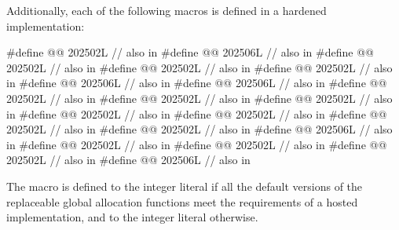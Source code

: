 \pnum
Additionally, each of the following macros is defined in a hardened implementation:
\begin{codeblock}
#define @@                    202502L // also in 
#define @@         202506L // also in 
#define @@             202502L // also in 
#define @@        202502L // also in 
#define @@                   202502L // also in 
#define @@          202506L // also in 
#define @@         202506L // also in 
#define @@                    202502L // also in 
#define @@                 202502L // also in 
#define @@             202502L // also in 
#define @@           202502L // also in 
#define @@                     202502L // also in 
#define @@                   202502L // also in 
#define @@                 202502L // also in 
#define @@         202506L // also in 
#define @@                     202502L // also in 
#define @@                 202502L // also in 
#define @@                   202502L // also in 
#define @@           202506L // also in 
\end{codeblock}

\pnum
The macro  is defined to
the integer literal 
if all the default versions of the replaceable global allocation functions meet
the requirements of a hosted implementation, and
to the integer literal  otherwise.

